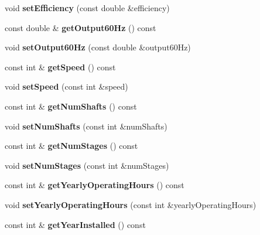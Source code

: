 \begin{DoxyCompactItemize}
void {\bfseries set\+Efficiency} (const double \&efficiency)
\item 
\mbox{\label{class_pump_data_a69e0915c66a075fc785821420e106ebd}} 
const double \& {\bfseries get\+Output60\+Hz} () const
\item 
\mbox{\label{class_pump_data_adf044cb65988254afd886615ec246282}} 
void {\bfseries set\+Output60\+Hz} (const double \&output60\+Hz)
\item 
\mbox{\label{class_pump_data_a67a5c601d46ce13a5c89ac960db5b1f7}} 
const int \& {\bfseries get\+Speed} () const
\item 
\mbox{\label{class_pump_data_a0f77b3df49389366a69f64723bbabbd5}} 
void {\bfseries set\+Speed} (const int \&speed)
\item 
\mbox{\label{class_pump_data_a322d6b480ce079bc744a0d7ab5100fce}} 
const int \& {\bfseries get\+Num\+Shafts} () const
\item 
\mbox{\label{class_pump_data_a878523749e12368d8327c4b240782a91}} 
void {\bfseries set\+Num\+Shafts} (const int \&num\+Shafts)
\item 
\mbox{\label{class_pump_data_ab339193f9fd8c40b41c1dea18e077d2e}} 
const int \& {\bfseries get\+Num\+Stages} () const
\item 
\mbox{\label{class_pump_data_a007fd13673a38cc97a64ae64f008b91e}} 
void {\bfseries set\+Num\+Stages} (const int \&num\+Stages)
\item 
\mbox{\label{class_pump_data_a22423814f5442e87cb24813fc0ab1027}} 
const int \& {\bfseries get\+Yearly\+Operating\+Hours} () const
\item 
\mbox{\label{class_pump_data_a9ab818690858c618efeb8646b9095498}} 
void {\bfseries set\+Yearly\+Operating\+Hours} (const int \&yearly\+Operating\+Hours)
\item 
\mbox{\label{class_pump_data_a1a965708bdae571676621e71513a6eff}} 
const int \& {\bfseries get\+Year\+Installed} () const

\end{DoxyCompactItemize}
